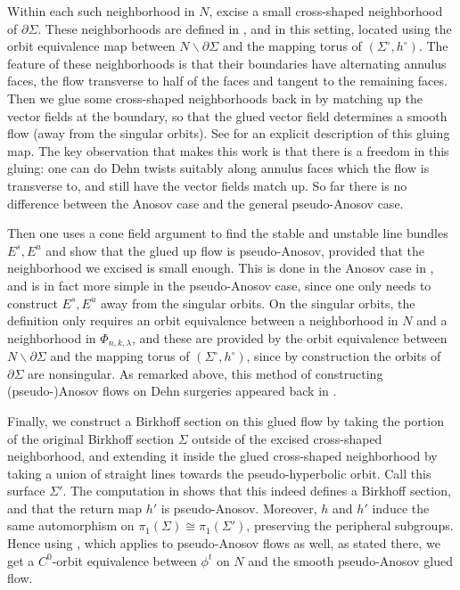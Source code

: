 \documentclass[12pt]{amsart}
\theoremstyle{definition}
\numberwithin{equation}{section}
\begin{document}
Within each such neighborhood in $N$, excise a small cross-shaped neighborhood of $\partial \Sigma$. These neighborhoods are defined in \cite[Section 5.2]{Sha21}, and in this setting, located using the orbit equivalence map between $N \backslash \partial \Sigma$ and the mapping torus of $(\Sigma^\circ, h^\circ)$. The feature of these neighborhoods is that their boundaries have alternating annulus faces, the flow transverse to half of the faces and tangent to the remaining faces. Then we glue some cross-shaped neighborhoods back in by matching up the vector fields at the boundary, so that the glued vector field determines a smooth flow (away from the singular orbits). See \cite[Section 5.3]{Sha21} for an explicit description of this gluing map. The key observation that makes this work is that there is a freedom in this gluing: one can do Dehn twists suitably along annulus faces which the flow is transverse to, and still have the vector fields match up. So far there is no difference between the Anosov case and the general pseudo-Anosov case. 

Then one uses a cone field argument to find the stable and unstable line bundles $E^s, E^u$ and show that the glued up flow is pseudo-Anosov, provided that the neighborhood we excised is small enough. This is done in the Anosov case in \cite[Section 5.4]{Sha21}, and is in fact more simple in the pseudo-Anosov case, since one only needs to construct $E^s, E^u$ away from the singular orbits. On the singular orbits, the definition only requires an orbit equivalence between a neighborhood in $N$ and a neighborhood in $\Phi_{n,k,\lambda}$, and these are provided by the orbit equivalence between $N \backslash \partial \Sigma$ and the mapping torus of $(\Sigma^\circ, h^\circ)$, since by construction the orbits of $\partial \Sigma$ are nonsingular. As remarked above, this method of constructing (pseudo-)Anosov flows on Dehn surgeries appeared back in \cite{Goo83}. 

Finally, we construct a Birkhoff section on this glued flow by taking the portion of the original Birkhoff section $\Sigma$ outside of the excised cross-shaped neighborhood, and extending it inside the glued cross-shaped neighborhood by taking a union of straight lines towards the pseudo-hyperbolic orbit. Call this surface $\Sigma'$. The computation in \cite[Section 5.5]{Sha21} shows that this indeed defines a Birkhoff section, and that the return map $h'$ is pseudo-Anosov. Moreover, $h$ and $h'$ induce the same automorphism on $\pi_1(\Sigma) \cong \pi_1(\Sigma')$, preserving the peripheral subgroups. Hence using \cite[Theorem 3.9]{Sha21}, which applies to pseudo-Anosov flows as well, as stated there, we get a $C^0$-orbit equivalence between $\phi^t$ on $N$ and the smooth pseudo-Anosov glued flow. 
\end{document}
